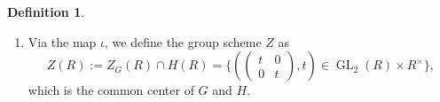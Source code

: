 \documentclass[11pt, a4paper]{amsart}
\theoremstyle{plain}
\theoremstyle{definition}
\newtheorem{definition}[theorem]{Definition}
\numberwithin{equation}{section}
\DeclareMathOperator{\GL}{\mathrm{GL}}
\begin{document}
\begin{definition}
\begin{enumerate}
\[            \]
        and 
                    \[p \colon H \twoheadrightarrow \GL_2, \quad (\begin{pmatrix} 
                                                                a & b \\
                                                                c & d \\
                                                             \end{pmatrix}, z) \mapsto \begin{pmatrix} 
                                                                                        a & b \\
                                                                                        c & d \\
                                                                                     \end{pmatrix}.           
        \]
        The relation between the groups $\GL_2$, $H$ and $G$ can be summarized in the diagram: 
        \[
            \begin{tikzcd}
                H \ar[r, hook] \ar[d, twoheadrightarrow] & G  \\
                \GL_2  &  
            \end{tikzcd}. 
        \]
        \item 
            Via the map $\iota$, we define the group scheme $Z$ as 
            \begin{equation}
            \label{eq: Z}
                Z(R) := Z_{G}(R) \cap H(R) = \{ (\begin{pmatrix}
                                                    t & 0 \\
                                                    0 & t 
                                                \end{pmatrix}, t) \in \GL_2(R) \times R^{\times}\},
            \end{equation}
            which is the common center of $G$ and $H$. 
\end{enumerate}
\end{definition}
\end{document}
